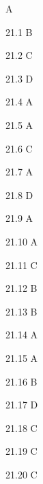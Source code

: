 \begin{Solution}{21}
A
\end{Solution}
\begin{Solution}{21.{1}}
B
\end{Solution}
\begin{Solution}{21.{2}}
C
\end{Solution}
\begin{Solution}{21.{3}}
D
\end{Solution}
\begin{Solution}{21.{4}}
A
\end{Solution}
\begin{Solution}{21.{5}}
A
\end{Solution}
\begin{Solution}{21.{6}}
C
\end{Solution}
\begin{Solution}{21.{7}}
A
\end{Solution}
\begin{Solution}{21.{8}}
D
\end{Solution}
\begin{Solution}{21.{9}}
A
\end{Solution}
\begin{Solution}{21.{10}}
A
\end{Solution}
\begin{Solution}{21.{11}}
C
\end{Solution}
\begin{Solution}{21.{12}}
B
\end{Solution}
\begin{Solution}{21.{13}}
B
\end{Solution}
\begin{Solution}{21.{14}}
A
\end{Solution}
\begin{Solution}{21.{15}}
A
\end{Solution}
\begin{Solution}{21.{16}}
B
\end{Solution}
\begin{Solution}{21.{17}}
D
\end{Solution}
\begin{Solution}{21.{18}}
C
\end{Solution}
\begin{Solution}{21.{19}}
C
\end{Solution}
\begin{Solution}{21.{20}}
C
\end{Solution}
